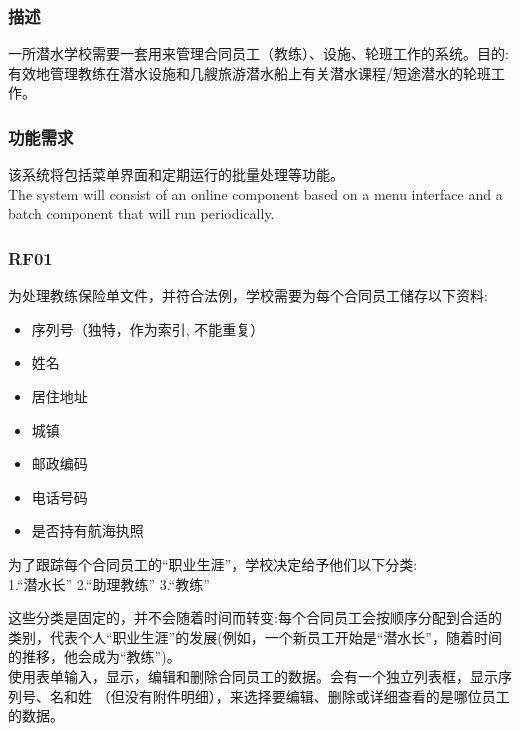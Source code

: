 \hypertarget{ux63a5ux4e58ux5ba2}{%
\subsubsection{描述}\label{ux63a5ux4e58ux5ba2}}

一所潜水学校需要一套用来管理合同员工（教练）、设施、轮班工作的系统。目的:有效地管理教练在潜水设施和几艘旅游潜水船上有关潜水课程/短途潜水的轮班工作。 \\
\hypertarget{ux63a5ux4e58ux5ba2}{%
\subsubsection{功能需求}\label{ux63a5ux4e58ux5ba2}}

该系统将包括菜单界面和定期运行的批量处理等功能。\\
The system will consist of an online component based on a menu interface and a batch component that will run periodically. \\

\hypertarget{ux63a5ux4e58ux5ba2}{%
\subsubsection{RF01}\label{ux63a5ux4e58ux5ba2}}

为处理教练保险单文件，并符合法例，学校需要为每个合同员工储存以下资料: \\


\begin{itemize}
\tightlist
\item
  序列号（独特，作为索引, 不能重复）
\item
  姓名
\item
  居住地址
\item
  城镇
\item
  邮政编码
\item
  电话号码
\item
  是否持有航海执照
\end{itemize}

为了跟踪每个合同员工的“职业生涯”，学校决定给予他们以下分类: \\
1.“潜水长”
2.“助理教练”
3.“教练”

这些分类是固定的，并不会随着时间而转变:每个合同员工会按顺序分配到合适的类别，代表个人“职业生涯”的发展(例如，一个新员工开始是“潜水长”，随着时间的推移，他会成为“教练”)。\\

使用表单输入，显示，编辑和删除合同员工的数据。会有一个独立列表框，显示序列号、名和姓 （但没有附件明细），来选择要编辑、删除或详细查看的是哪位员工的数据。\\


